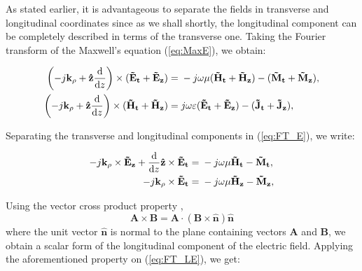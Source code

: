 \documentclass[11pt]{article}
\begin{document}
  As stated earlier, it is advantageous to separate the fields in transverse and longitudinal coordinates since as we shall shortly, the longitudinal component can be completely described in terms of the transverse one. Taking the Fourier transform of the Maxwell's equation (\ref{eq:MaxE}), we obtain:

  \begin{subequations}
    \begin{align}
      \left(-j\mathbf{k_{\rho}} + \mathbf{\hat{z}} \dv{}{z} \right)\times (\mathbf{\tilde{E}_t} + \mathbf{\tilde{E}_z})  ={}& -j \omega \mu (\mathbf{\tilde{H}_t} + \mathbf{\tilde{H}_z}) -
      (\mathbf{\tilde{M}_t} + \mathbf{\tilde{M}_z}),
      \label{eq:FT_E}\\
      \left(-j\mathbf{k_{\rho}} + \mathbf{\hat{z}} \dv{}{z} \right)\times (\mathbf{\tilde{H}_t} + \mathbf{\tilde{H}_z})  ={}& j \omega \varepsilon (\mathbf{\tilde{E}_t} + \mathbf{\tilde{E}_z}) -
      (\mathbf{\tilde{J}_t} + \mathbf{\tilde{J}_z}),
      \label{eq:FT_H}
    \end{align}
    \label{eq:FT_MaxE}
  \end{subequations}

  Separating the transverse and longitudinal components in (\ref{eq:FT_E}), we write:

  \begin{subequations}
    \begin{align}
      -j\mathbf{k_{\rho}} \times \mathbf{\tilde{E}_z} +
      \dv{}{z}\mathbf{\hat{z}} \times \mathbf{\tilde{E}_t} ={}&
      -j \omega \mu \mathbf{\tilde{H}_t} -
      \mathbf{\tilde{M}_t},
      \label{eq:FT_TE}\\
      -j\mathbf{k_{\rho}} \times \mathbf{\tilde{E}_t} ={}&
      -j \omega \mu \mathbf{\tilde{H}_z} -
      \mathbf{\tilde{M}_z},
      \label{eq:FT_LE}
    \end{align}
    \label{eq:FT_TLE}
  \end{subequations}

  Using the vector cross product property \cite[p. 117]{fang2009antenna},
  \begin{equation}
    \mathbf{A}\times\mathbf{B} =\mathbf{A}\cdot (\mathbf{B} \times \mathbf{\hat{n}})\mathbf{\hat{n}}
    \label{eq:vec}
  \end{equation}
  where the unit vector $\mathbf{\hat{n}}$ is normal to the plane containing vectors $\mathbf{A}$ and $\mathbf{B}$, we obtain a scalar form of the longitudinal component of the electric field. Applying the aforementioned property on (\ref{eq:FT_LE}), we get:
\end{document}
